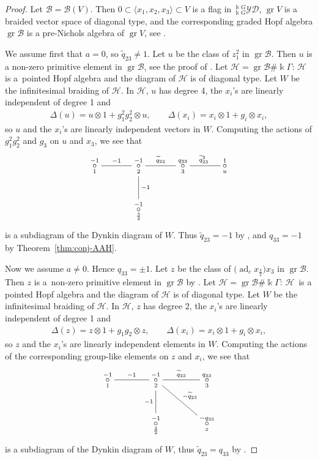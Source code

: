 \documentclass[10pt,a4paper]{amsart}
\numberwithin{equation}{section}
\newcommand{\adc}{\operatorname{ad}_c}
\newcommand{\gr}{\operatorname{gr}}
\newcommand{\toba}{\mathscr B}
\newcommand{\yd}[1]{{}_{#1}^{#1}\mathcal{YD}}
\newcommand{\tresdos}{\frac{3}{2}}
\begin{document}
\begin{proof}
Let $\toba=\toba(V)$. Then $0 \subset \langle x_1, x_2, x_3\rangle \subset V$ is a flag in $\yd{\Bbbk G}$, $\gr V$ is a braided vector space of diagonal type, and the corresponding graded Hopf algebra $\gr \toba$ is a pre-Nichols algebra of $\gr V$, see \cite[Lemma 3.4.2]{AAH-triang}.

We assume first that $a=0$, so $\widetilde{q}_{23}\ne 1$.
Let $u$ be the class of $z_1^2$ in $\gr \toba$. Then $u$ is a non-zero primitive element in $\gr \toba$, see the proof of \cite[Proposition 8.1.8]{AAH-triang}. Let $\mathcal{H}=\gr \toba\#\Bbbk\Gamma$: $\mathcal{H}$ is a~pointed Hopf algebra and the diagram of $\mathcal{H}$ is of diagonal type. Let $W$ be the infinitesimal braiding of $\mathcal{H}$. In $\mathcal{H}$, $u$ has degree 4, the $x_i$'s are linearly independent of degree 1 and
\begin{align*}
\Delta(u) =u\otimes 1+g_1^2g_2^2 \otimes u, \qquad \Delta(x_i)=x_i\otimes 1+g_i\otimes x_i,
\end{align*}
so $u$ and the $x_i$'s are linearly independent vectors in $W$.
Computing the actions of $g_1^2g_2^2$ and $g_3$ on $u$ and $x_3$, we see that
$$
\xymatrix@C=35pt{\overset{-1}{\underset{1}{\circ}} \ar@{-}[r]^{-1} & \overset{-1}{\underset{2}{\circ}} \ar@{-}[d]^{-1} \ar @{-}[r]^{\widetilde{q}_{23}} &
\overset{q_{33}}{\underset{3}{\circ}} \ar @{-}[r]^{\widetilde{q}_{23}^2} & \overset{1}{\underset{u}{\circ}}
\\ & \overset{-1}{\underset{\tresdos}{\circ}} & &}
$$
is a subdiagram of the Dynkin diagram of $W$. Thus $\widetilde{q}_{23}=-1$ by \cite[Lemma 2.3.7]{AAH-triang},
and $q_{33}=-1$ by Theorem~\ref{thm:conj-AAH}.

Now we assume $a\ne 0$. Hence $q_{33}= \pm 1$.
Let $z$ be the class of $\big(\adc x_{\tresdos}\big)x_3$ in $\gr \toba$. Then $z$ is a~non-zero primitive element in $\gr \toba$ by \cite[Propositions 8.1.6 and 8.1.7]{AAH-triang}. Let $\mathcal{H}=\gr \toba\#\Bbbk\Gamma$: $\mathcal{H}$~is a pointed Hopf algebra and the diagram of $\mathcal{H}$ is of diagonal type. Let $W$ be the infinitesimal braiding of $\mathcal{H}$. In $\mathcal{H}$, $z$ has degree 2, the $x_i$'s are linearly independent of degree 1 and
\begin{align*}
\Delta(z) =z\otimes 1+g_1g_2 \otimes z, \qquad \Delta(x_i)=x_i\otimes 1+g_i\otimes x_i,
\end{align*}
so $z$ and the $x_i$'s are linearly independent elements in $W$.
Computing the actions of the corresponding group-like elements on $z$ and $x_i$, we see that
$$
\xymatrix@C=40pt{\overset{-1}{\underset{1}{\circ}} \ar@{-}[r]^{-1} & \overset{-1}{\underset{2}{\circ}} \ar@{-}[d]_{-1} \ar @{-}[r]^{\widetilde{q}_{23}}
\ar@{-}[rd]^{-\widetilde{q}_{23}} & \overset{q_{33}}{\underset{3}{\circ}}
\\ & \overset{-1}{\underset{\tresdos}{\circ}} & \overset{-q_{33}}{\underset{z}{\circ}}}
$$
is a subdiagram of the Dynkin diagram of $W$, thus $\widetilde{q}_{23}=q_{33}$ by \cite[Lemma 2.3.7]{AAH-triang}.
\end{proof}
\end{document}
